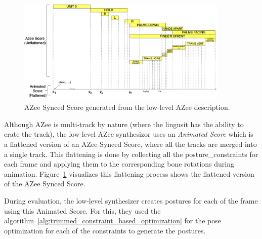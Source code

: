 \documentclass[../../main.tex]{subfiles}
\begin{document}
\begin{figure}[h]
  \centering
  \includegraphics[width=0.9\textwidth]{chapters/background_work/images/azee_score_armoire_combined.png}
  \caption{AZee Synced Score generated from the low-level AZee description.}
  \label{fig:azee_score_armoire_combined}
\end{figure}

Although AZee is multi-track by nature (where the lingusit has the ability to crate the track), the low-level AZee synthesizor uses an \emph{Animated Score} which is a flattened version of an AZee Synced Score, where all the tracks are merged into a single track. This flattening is done by collecting all the \gls{posture_constraint}s for each frame and applying them to the corresponding bone rotations during animation. Figure~\ref{fig:azee_score_armoire_combined} visualizes this flattening process shows the flattened version of the AZee Synced Score.

During evaluation, the low-level synthesizer creates postures for each of the frame using this Animated Score. For this, they used the algorithm~\ref{alg:trimmed_constraint_based_optimization} for the pose optimization for each of the constraints to generate the postures. 
\end{document}
